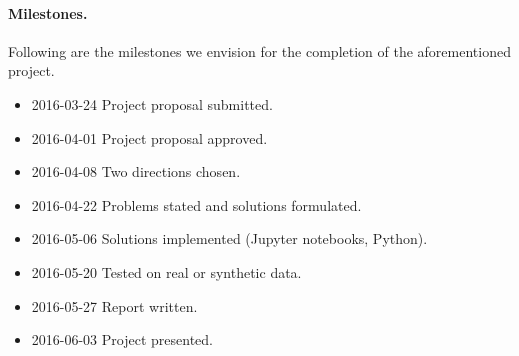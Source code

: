\documentclass[a4paper,11pt]{article}
\begin{document}
\paragraph{Milestones.}
Following are the milestones we envision for the completion of the
aforementioned project.
\begin{itemize}
	\setlength{\itemsep}{0pt} \setlength{\parskip}{0pt}
	\item 2016-03-24 Project proposal submitted.
	\item 2016-04-01 Project proposal approved.
	\item 2016-04-08 Two directions chosen.
	\item 2016-04-22 Problems stated and solutions formulated.
	\item 2016-05-06 Solutions implemented (Jupyter notebooks, Python).
	\item 2016-05-20 Tested on real or synthetic data.
	\item 2016-05-27 Report written.
	\item 2016-06-03 Project presented.
	\end{itemize}

\printbibliography
\end{document}
